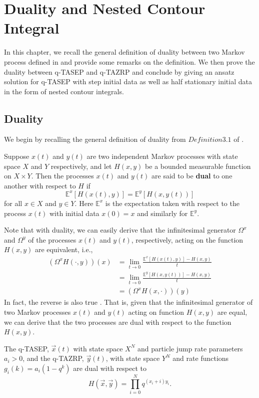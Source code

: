\chapter{Duality and Nested Contour Integral}
In this chapter, we recall the general definition of duality between two Markov process defined in \cite{interacting-particle-system} and provide some remarks on the definition. We then prove the duality between q-TASEP and q-TAZRP and conclude by giving an ansatz solution for q-TASEP with step initial data as well as half stationary initial data in the form of nested contour integrals.

\section{Duality}
We begin by recalling the general definition of duality from $Definition 3.1$ of \cite{interacting-particle-system}.
\begin{definition}
Suppose $x(t)$ and $y(t)$ are two independent Markov processes with state space $X$ and $Y$ respectively, and let $H(x,y)$ be a bounded measurable function on $X\times Y$. Then the processes $x(t)$ and $y(t)$ are said to be \textbf{dual} to one another with respect to $H$ if $$\mathbb{E}^{x}[H(x(t),y)] = \mathbb{E}^{y}[H(x,y(t))]$$ for all $x \in X$ and $y \in Y$. Here $\mathbb{E}^x$ is the expectation taken with respect to the process $x(t)$ with initial data $x(0) = x$ and similarly for $\mathbb{E}^y$.
\end{definition}
Note that with duality, we can easily derive that the infinitesimal generator $\Omega^x$ and $\Omega^y$ of the processes $x(t)$ and $y(t)$, respectively, acting on the function $H(x,y)$ are equivalent, i.e., 
\begin{align}
(\Omega^x H(\cdot,y))(x) &= \lim_{t \rightarrow 0} \frac{\mathbb{E}^{x}[H(x(t),y)] - H(x,y)}{t}\\
												&= \lim_{t \rightarrow 0} \frac{\mathbb{E}^{y}[H(x,y(t))] - H(x,y)}{t}\\
												&= (\Omega^x H(x,\cdot))(y)
\end{align}
In fact, the reverse is also true . That is, given that the infinitesimal generator of two Markov processes $x(t)$ and $y(t)$ acting on function $H(x,y)$ are equal, we can derive that the two processes are dual with respect to the function $H(x,y)$. 

\begin{theorem}
The q-TASEP, $\vec{x}(t)$ with state space $X^N$ and particle jump rate parameters $a_i>0$, and the q-TAZRP, $\vec{y}(t)$, with state space $Y^N$ and rate functions $g_i(k)=a_i(1-q^k)$ are dual with respect to $$H(\vec{x},\vec{y}) = \prod_{i=0}^{N} q^{(x_i + i)y_i}.$$
\end{theorem}

